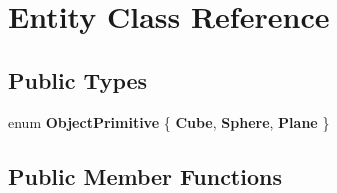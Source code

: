 \hypertarget{class_entity}{}\section{Entity Class Reference}
\label{class_entity}
\subsection*{Public Types}
\begin{DoxyCompactItemize}
\item 
\mbox{\label{class_entity_aa8b6fb0a3b0ff1d9191282c998918027}} 
enum {\bfseries Object\+Primitive} \{ {\bfseries Cube}, 
{\bfseries Sphere}, 
{\bfseries Plane}
 \}
\end{DoxyCompactItemize}
\subsection*{Public Member Functions}
